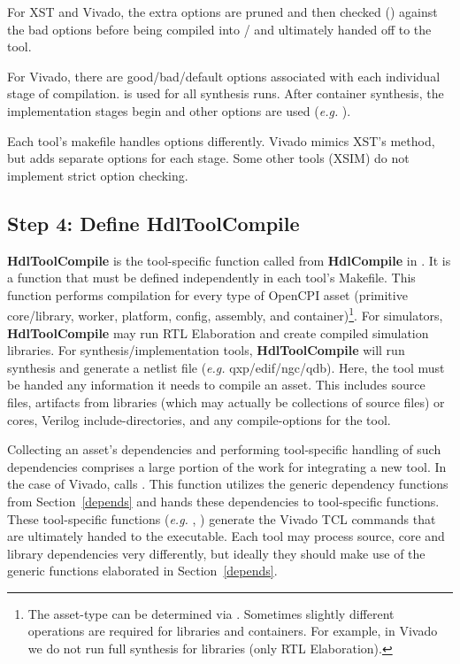 For XST and Vivado, the extra options are pruned and then checked () against the bad options before being compiled into / and ultimately handed off to the tool. \newline

For Vivado, there are good/bad/default options associated with each individual stage of compilation.  is used for all synthesis runs. After container synthesis, the implementation stages begin and other options are used (\textit{e.g.} ).\newline

Each tool's makefile handles options differently. Vivado mimics XST's method, but adds separate options for each stage. Some other tools (XSIM) do not implement strict option checking.

\subsection{Step 4: Define HdlToolCompile}
\label{hdltoolcompile}
\textbf{HdlToolCompile} is the tool-specific function called from \textbf{HdlCompile} in . It is a function that must be defined independently in each tool's Makefile. This function performs compilation for every type of OpenCPI asset (primitive core/library, worker, platform, config, assembly, and container)\footnote{The asset-type can be determined via . Sometimes slightly different operations are required for libraries and containers. For example, in Vivado we do not run full synthesis for libraries (only RTL Elaboration).}. For simulators, \textbf{HdlToolCompile} may run RTL Elaboration and create compiled simulation libraries. For synthesis/implementation tools, \textbf{HdlToolCompile} will run synthesis and generate a netlist file (\textit{e.g.} qxp/edif/ngc/qdb). Here, the tool must be handed any information it needs to compile an asset. This includes source files, artifacts from libraries (which may actually be collections of source files) or cores, Verilog include-directories, and any compile-options for the tool.\newline

Collecting an asset's dependencies and performing tool-specific handling of such dependencies comprises a large portion of the work for integrating a new tool. In the case of Vivado,  calls . This function utilizes the generic dependency functions from Section~\ref{depends} and hands these dependencies to tool-specific functions. These tool-specific functions (\textit{e.g.} , ) generate the Vivado TCL commands that are ultimately handed to the  executable. Each tool may process source, core and library dependencies very differently, but ideally they should make use of the generic functions elaborated in Section~\ref{depends}.

